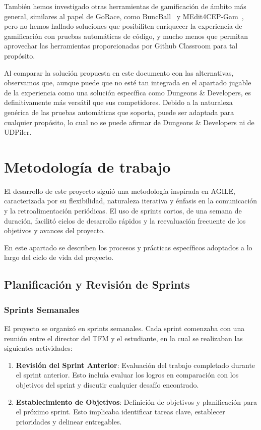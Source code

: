 También hemos investigado otras herramientas de gamificación de ámbito más general, similares al papel de GoRace, como BuncBall~\cite{biworldwideAboutBunchball} y MEdit4CEP-Gam~\cite{MEdit4CEP-Gam}, pero no hemos hallado soluciones que posibiliten enriquecer la experiencia de gamificación con pruebas automáticas de código, y mucho menos que permitan aprovechar las herramientas proporcionadas por Github Classroom para tal propósito.

Al comparar la solución propuesta en este documento con las alternativas, observamos que, aunque puede que no esté tan integrada en el apartado jugable de la experiencia como una solución específica como Dungeons \& Developers, es definitivamente más versátil que sus competidores. Debido a la naturaleza genérica de las pruebas automáticas que soporta, puede ser adaptada para cualquier propósito, lo cual no se puede afirmar de Dungeons \& Developers ni de UDPiler.

\section{Metodología de trabajo}
El desarrollo de este proyecto siguió una metodología inspirada en AGILE, caracterizada por su flexibilidad, naturaleza iterativa y énfasis en la comunicación y la retroalimentación periódicas. El uso de sprints cortos, de una semana de duración, facilitó ciclos de desarrollo rápidos y la reevaluación frecuente de los objetivos y avances del proyecto.

En este apartado se describen los procesos y prácticas específicos adoptados a lo largo del ciclo de vida del proyecto.
\subsection{Planificación y Revisión de Sprints}

\subsubsection{Sprints Semanales}
El proyecto se organizó en sprints semanales. Cada sprint comenzaba con una reunión entre el director del \acrshort{TFM} y el estudiante, en la cual se realizaban las siguientes actividades:

\begin{enumerate}
    \item \textbf{Revisión del Sprint Anterior}: Evaluación del trabajo completado durante el sprint anterior. Esto incluía evaluar los logros en comparación con los objetivos del sprint y discutir cualquier desafío encontrado.
    \item \textbf{Establecimiento de Objetivos}: Definición de objetivos y planificación para el próximo sprint. Esto implicaba identificar tareas clave, establecer prioridades y delinear entregables.
\end{enumerate}

